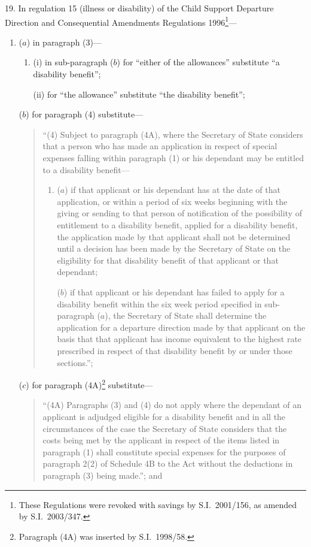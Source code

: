 \documentclass[12pt,a4paper]{article}
\begin{document}
19.  In regulation 15 (illness or disability) of the Child Support Departure Direction and Consequential Amendments Regulations 1996\footnote{These Regulations were revoked with savings by S.I.~2001/156, as amended by S.I.~2003/347.}—
\begin{enumerate}\item[]
($a$) in paragraph (3)—
\begin{enumerate}\item[]
(i) in sub-paragraph ($b$)  for “either of the allowances” substitute “a disability benefit”;

(ii) for “the allowance” substitute “the disability benefit”;
\end{enumerate}

($b$) for paragraph (4) substitute—
\begin{quotation}
“(4) Subject to paragraph (4A), where the Secretary of State considers that a person who has made an application in respect of special expenses falling within paragraph (1) or his dependant may be entitled to a disability benefit—
\begin{enumerate}\item[]
($a$) if that applicant or his dependant has at the date of that application, or within a period of six weeks beginning with the giving or sending to that person of notification of the possibility of entitlement to a disability benefit, applied for a disability benefit, the application made by that applicant shall not be determined until a decision has been made by the Secretary of State on the eligibility for that disability benefit of that applicant or that dependant;

($b$) if that applicant or his dependant has failed to apply for a disability benefit within the six week period specified in sub-paragraph ($a$), the Secretary of State shall determine the application for a departure direction made by that applicant on the basis that that applicant has income equivalent to the highest rate prescribed in respect of that disability benefit by or under those sections.”;
\end{enumerate}
\end{quotation}

($c$) for paragraph (4A)\footnote{Paragraph (4A) was inserted by S.I.~1998/58.} substitute—
\begin{quotation}
“(4A) Paragraphs (3) and (4) do not apply where the dependant of an applicant is adjudged eligible for a disability benefit and in all the circumstances of the case the Secretary of State considers that the costs being met by the applicant in respect of the items listed in paragraph (1) shall constitute special expenses for the purposes of paragraph 2(2) of Schedule 4B to the Act without the deductions in paragraph (3) being made.”; and
\end{quotation}


\end{enumerate}
\end{document}
